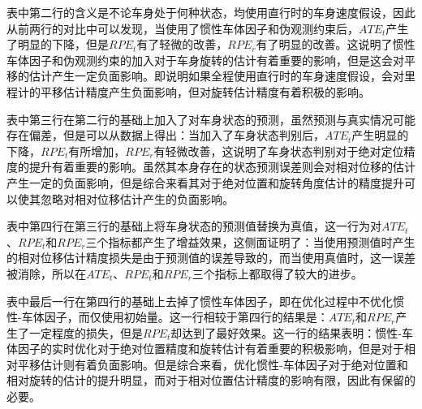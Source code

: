 表中第二行的含义是不论车身处于何种状态，均使用直行时的车身速度假设，因此从前两行的对比中可以发现，当使用了惯性车体因子和伪观测约束后，$ATE_t$产生了明显的下降，但是$RPE_t$有了轻微的改善，$RPE_r$有了明显的改善。这说明了惯性车体因子和伪观测约束的加入对于车身旋转的估计有着重要的影响，但是这会对平移的估计产生一定负面影响。即说明如果全程使用直行时的车身速度假设，会对里程计的平移估计精度产生负面影响，但对旋转估计精度有着积极的影响。

表中第三行在第二行的基础上加入了对车身状态的预测，虽然预测与真实情况可能存在偏差，但是可以从数据上得出：当加入了车身状态判别后，$ATE_t$产生明显的下降，$RPE_t$有所增加，$RPE_r$有轻微改善，这说明了车身状态判别对于绝对定位精度的提升有着重要的影响。虽然其本身存在的状态预测误差则会对相对位移的估计产生一定的负面影响，但是综合来看其对于绝对位置和旋转角度估计的精度提升可以使其忽略对相对位移估计产生的负面影响。

表中第四行在第三行的基础上将车身状态的预测值替换为真值，这一行为对$ATE_t$、$RPE_t$和$RPE_r$三个指标都产生了增益效果，这侧面证明了：当使用预测值时产生的相对位移估计精度损失是由于预测值的误差导致的，而当使用真值时，这一误差被消除，所以在$ATE_t$、$RPE_t$和$RPE_r$三个指标上都取得了较大的进步。

表中最后一行在第四行的基础上去掉了惯性车体因子，即在优化过程中不优化惯性-车体因子，而仅使用初始量。这一行相较于第四行的结果是：$ATE_t$和$RPE_r$产生了一定程度的损失，但是$RPE_t$却达到了最好效果。这一行的结果表明：惯性-车体因子的实时优化对于绝对位置精度和旋转估计有着重要的积极影响，但是对于相对平移估计则有着负面影响。但是综合来看，优化惯性-车体因子对于绝对位置和相对旋转的估计的提升明显，而对于相对位置估计精度的影响有限，因此有保留的必要。




